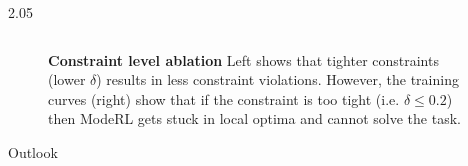 \documentclass[final,12pt]{beamer}
\newlength{\colwidth}
\begin{document}
\begin{frame}[t]
\begin{columns}[t]
\begin{column}{2.05\colwidth}
\begin{columns}[t]
\begin{column}{\colwidth}
  \begin{figure}[!h]

    \caption{\textbf{Constraint level ablation} Left shows that tighter constraints (lower $\delta$) results in less constraint violations. However, the training curves (right) show that if the constraint is too tight (i.e. $\delta \leq 0.2$) then \alert{ModeRL} gets stuck in local optima and cannot solve the task.}
    \label{fig-training-curve}
  \end{figure}

  \begin{block}{Outlook}



\end{block}
\end{column}
\end{columns}
\end{column}
\end{columns}
\end{frame}
\end{document}
